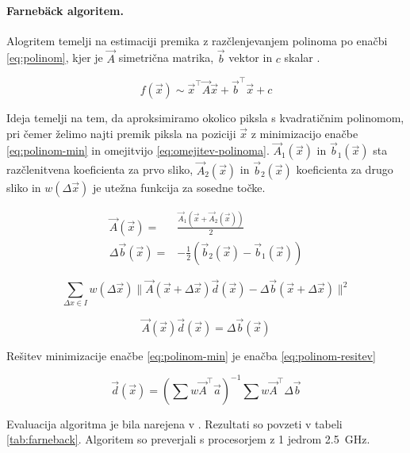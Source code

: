 \paragraph{Farneb{\"a}ck algoritem.}
Alogritem temelji na estimaciji premika z razčlenjevanjem polinoma  po enačbi \eqref{eq:polinom}, kjer je $\vec{A}$ simetrična matrika, $\vec{b}$ vektor in $c$ skalar \cite{farneback2003two}.

\begin{equation}\label{eq:polinom}
	f(\vec{x}) \sim \vec{x}^\top \vec{A} \vec{x} + \vec{b}^\top \vec{x} + c
\end{equation}

Ideja temelji na tem, da aproksimiramo okolico piksla s kvadratičnim polinomom, pri čemer želimo najti premik piksla na poziciji $\vec{x}$ z minimizacijo enačbe \eqref{eq:polinom-min} in omejitvijo \eqref{eq:omejitev-polinoma}. $\vec{A}_1(\vec{x})$ in $\vec{b}_1(\vec{x})$ sta razčlenitvena koeficienta za prvo sliko, $\vec{A}_2(\vec{x})$ in $\vec{b}_2(\vec{x})$ koeficienta za drugo sliko in $w(\Delta\vec{x})$ je utežna funkcija za sosedne točke.

\begin{align}
\vec{A}(\vec{x}) = & \frac{\vec{A}_1(\vec{x} + \vec{A}_2(\vec{x}))}{2} \\
\Delta\vec{b}(\vec{x}) = & - \frac{1}{2}\left(\vec{b}_2(\vec{x}) - \vec{b}_1(\vec{x})\right) 
\end{align}

\begin{equation}\label{eq:polinom-min}
\sum_{\Delta x \in I} w(\Delta\vec{x}) \| \vec{A}(\vec{x} + \Delta\vec{x})\vec{d}(\vec{x}) - \Delta\vec{b}(\vec{x} +\Delta\vec{x}) \|^2
\end{equation}

\begin{equation}\label{eq:omejitev-polinoma}
\vec{A}(\vec{x})\vec{d}(\vec{x}) = \Delta\vec{b}(\vec{x})
\end{equation}

Rešitev minimizacije enačbe \eqref{eq:polinom-min} je enačba \eqref{eq:polinom-resitev}

\begin{equation}\label{eq:polinom-resitev}
 \vec{d}(\vec{x}) = \left( \sum w \vec{A}^\top \vec{a} \right)^{-1} \sum w \vec{A}^\top \Delta\vec{b}
\end{equation}

Evaluacija algoritma je bila narejena v \cite{Geiger2012CVPR}. Rezultati so povzeti v tabeli \ref{tab:farneback}. Algoritem so preverjali s procesorjem z 1 jedrom \@ \SI{2.5}{GHz}.

